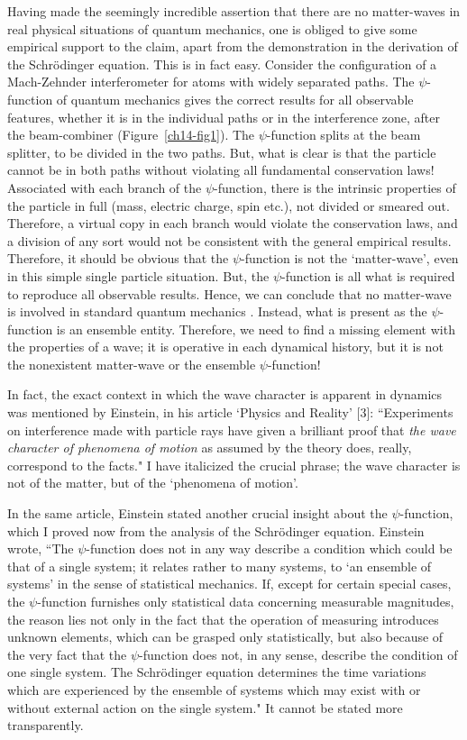 Having made the seemingly incredible assertion that there are no matter-waves in real
physical situations of quantum mechanics, one is obliged to give some empirical support to
the claim, apart from the demonstration in the derivation of the Schr\"{o}dinger equation. This
is in fact easy. Consider the configuration of a Mach-Zehnder interferometer for atoms with
widely separated paths. The $\psi$-function of quantum mechanics gives the correct results for
all observable features, whether it is in the individual paths or in the interference zone, after
the beam-combiner (Figure~\ref{ch14-fig1}). The $\psi$-function splits at the beam splitter, to be divided in the two
paths. But, what is clear is that the particle cannot be in both paths without violating
all fundamental conservation laws! Associated with each branch of the $\psi$-function, there is
the intrinsic properties of the particle in full (mass, electric charge, spin etc.), not divided
or smeared out. Therefore, a virtual copy in each branch would violate the conservation
laws, and a division of any sort would not be consistent with the general empirical results.
Therefore, it should be obvious that the $\psi$-function is not the `matter-wave', even in this
simple single particle situation. But, the $\psi$-function is all what is required to reproduce
all observable results. Hence, we can conclude that no matter-wave is involved in standard quantum
mechanics \cite{chap14-key2}. Instead, what is present as the $\psi$-function is an ensemble entity. Therefore,
we need to find a missing element with the properties of a wave; it is operative in each dynamical history, but it is not
the nonexistent matter-wave or the ensemble $\psi$-function!
\newpage

In fact, the exact context in which the wave character is apparent in dynamics was
mentioned by Einstein, in his article `Physics and Reality' [3]: ``Experiments on interference
made with particle rays have given a brilliant proof that \textit{the wave character of phenomena of
motion} as assumed by the theory does, really, correspond to the facts." I have italicized the
crucial phrase; the wave character is not of the matter, but of the `phenomena of motion'.

In the same article, Einstein stated another crucial insight about the $\psi$-function, which I
proved now from the analysis of the Schr\"{o}dinger equation. Einstein wrote, “The $\psi$-function
does not in any way describe a condition which could be that of a single system; it relates
rather to many systems, to `an ensemble of systems' in the sense of statistical mechanics.
If, except for certain special cases, the $\psi$-function furnishes only statistical data concerning
measurable magnitudes, the reason lies not only in the fact that the operation of measuring
introduces unknown elements, which can be grasped only statistically, but also because of
the very fact that the $\psi$-function does not, in any sense, describe the condition of one single
system. The Schr\"{o}dinger equation determines the time variations which are experienced
by the ensemble of systems which may exist with or without external action on the single
system." It cannot be stated more transparently.

